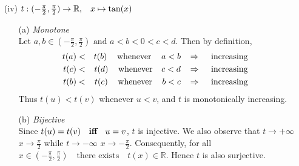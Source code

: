 \documentclass[12pt]{amsart}
\begin{document}
\begin{enumerate}
\begin{enumerate}
\begin{enumerate}
				\end{enumerate}
				
			\item[(iv)] $t: (-\frac{\pi}{2}, \frac{\pi}{2}) \rightarrow \mathbb{R}, \hspace{0.3cm} x \mapsto 
					\tan(x)$\\
			
				\begin{enumerate}
				
					\item[(a)] \emph{Monotone}\\
					Let $a,b \in (-\frac{\pi}{2}, \frac{\pi}{2}) \text{ and } a<b<0<c<d$. Then by definition,
					\begin{eqnarray}
						t(a)&<& t(b) \hspace{0.3cm} \text{ whenever } \hspace{0.3cm} a<b 
						\hspace{0.3cm} \Rightarrow \hspace{0.3cm} \text { increasing }\nonumber \\
						t(c)&<& t(d) \hspace{0.3cm} \text{ whenever } \hspace{0.25cm} c<d 
						\hspace{0.3cm} \Rightarrow \hspace{0.3cm} \text { increasing }\nonumber \\
						t(b)&<&t(c) \hspace{0.3cm} \text{ whenever } \hspace{0.3cm} b<c 
						\hspace{0.3cm} \Rightarrow \hspace{0.3cm} \text { increasing }\nonumber
					\end{eqnarray}
					Thus $t(u) < t(v)$ whenever $u < v$, and $t$ is monotonically increasing.\\  	
					
					\item[(b)] \emph{Bijective}\\
					Since $t(u) = t(v) \hspace{0.2cm} \textbf{ iff } \hspace{0.2cm} u = v$, $t$ is injective. 						We also observe that $t \rightarrow +\infty$  $x \rightarrow \frac{\pi}{2}$ 
					\hspace{0.1cm} while \hspace{0.1cm} $t \rightarrow -\infty$  $x \rightarrow -					\frac{\pi}{2}$. Consequently, for all $x \in (-\frac{\pi}{2}, \frac{\pi}{2}) \text{ } 
					\text{ there exists } \text{ } t(x) \in \mathbb{R}$.  Hence $t$ is also surjective. \\
			

\end{enumerate}
\end{enumerate}
\end{enumerate}
\end{document}
